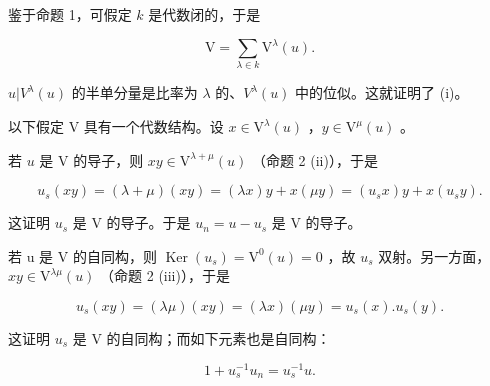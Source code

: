 鉴于命题 1，可假定 \(k\) 是代数闭的，于是

\[
\mathrm{V} = \sum_ {\lambda \in k} \mathrm{V} ^ {\lambda} (u).
\]

\(u|V^{\lambda}(u)\) 的半单分量是比率为 \(\lambda\) 的、\(V^{\lambda}(u)\) 中的位似。这就证明了 (i)。

以下假定 \(\mathrm{V}\) 具有一个代数结构。设 \(x \in \mathrm{V}^{\lambda}(u)\) ，\(y \in \mathrm{V}^{\mu}(u)\) 。

若 \(u\) 是 \(\mathrm{V}\) 的导子，则 \(xy \in \mathrm{V}^{\lambda + \mu}(u)\) （命题 2 (ii)），于是

\[
u _ {s} (x y) = (\lambda + \mu) (x y) = (\lambda x) y + x (\mu y) = (u _ {s} x) y + x (u _ {s} y).
\]

这证明 \(u_{s}\) 是 V 的导子。于是 \(u_{n} = u - u_{s}\) 是 V 的导子。

若 u 是 V 的自同构，则 \(\operatorname{Ker}(u_{s}) = \mathrm{V}^{0}(u) = 0\) ，故 \(u_{s}\) 双射。另一方面，\(xy \in \mathrm{V}^{\lambda\mu}(u)\) （命题 2 (iii)），于是

\[
u _ {s} (x y) = (\lambda \mu) (x y) = (\lambda x) (\mu y) = u _ {s} (x). u _ {s} (y).
\]

这证明 \(u_{s}\) 是 V 的自同构；而如下元素也是自同构：

\[
1 + u _ {s} ^ {- 1} u _ {n} = u _ {s} ^ {- 1} u.
\]

